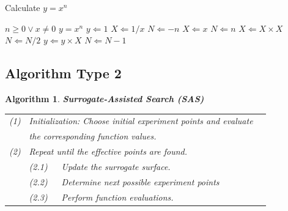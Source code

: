 \documentclass[12pt,a4paper]{article}
\newtheorem{algorithm_01}[theorem]{Algorithm}
\begin{document}
\begin{algorithm}
\caption{Calculate $y = x^n$}
\label{alg1}
\begin{algorithmic}[1]
\REQUIRE $n \geq 0 \vee x \neq 0$
\ENSURE $y = x^n$
\STATE $y \Leftarrow 1$
\STATE $X \Leftarrow 1 / x$
\STATE $N \Leftarrow -n$
\ELSE
\STATE $X \Leftarrow x$
\STATE $N \Leftarrow n$
\ENDIF
{}
\STATE $X \Leftarrow X \times X$
\STATE $N \Leftarrow N / 2$
\ELSE[$N$ is odd]
\STATE $y \Leftarrow y \times X$
\STATE $N \Leftarrow N - 1$
\ENDIF
\ENDWHILE
\end{algorithmic}
\label{alg:01}
\end{algorithm}


\subsection{Algorithm Type 2}
\label{sec:alg_02}

\begin{algorithm_01}
\label{alg:surrogate} \textbf{Surrogate-Assisted Search (SAS)}\\
\begin{tabular}{|lllll|}
\hline
(1) & \multicolumn{3}{l}{Initialization: Choose initial experiment points and evaluate} & \\
    & \multicolumn{3}{l}{the corresponding function values.} & \\
(2) & \multicolumn{3}{l}{Repeat until the effective points are found.} & \\

& (2.1) & \multicolumn{2}{l}{Update the surrogate surface.} & \\
& (2.2) & \multicolumn{2}{l}{Determine next possible experiment points} & \\
& (2.3) & \multicolumn{2}{l}{Perform function evaluations.} & \\
\hline
\end{tabular}
\end{algorithm_01}

\end{document}
